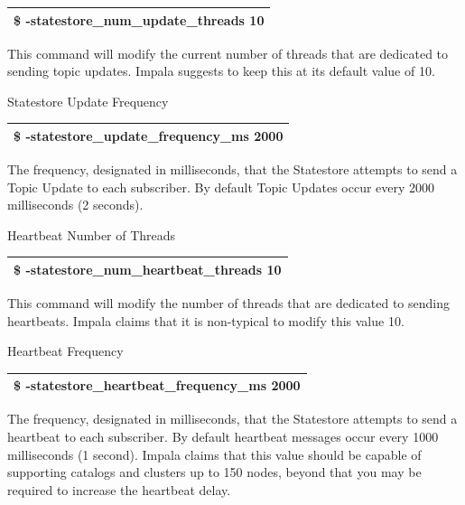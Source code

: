 \documentclass[onecolumn, draftclsnofoot,10pt, compsoc]{IEEEtran}
\begin{document}
\begin{center}
\begin{tabular}{ |c| }
    \hline
    \$ -statestore\_num\_update\_threads 10 \\
    \hline
\end{tabular}
\end{center}

This command will modify the current number of threads that are dedicated to sending topic updates.
Impala suggests to keep this at its default value of 10.

Statestore Update Frequency

\begin{center}
\begin{tabular}{ |c| }
    \hline
    \$ -statestore\_update\_frequency\_ms 2000 \\
    \hline
\end{tabular}
\end{center}

The frequency, designated in milliseconds, that the Statestore attempts to send a Topic Update to each subscriber.
By default Topic Updates occur every 2000 milliseconds (2 seconds).

Heartbeat Number of Threads
\begin{center}
\begin{tabular}{ |c| }
    \hline
    \$ -statestore\_num\_heartbeat\_threads 10 \\
    \hline
\end{tabular}
\end{center}

This command will modify the number of threads that are dedicated to sending heartbeats.
Impala claims that it is non-typical to modify this value 10.

Heartbeat Frequency

\begin{center}
\begin{tabular}{ |c| }
    \hline
    \$ -statestore\_heartbeat\_frequency\_ms 2000 \\
    \hline
\end{tabular}
\end{center}

The frequency, designated in milliseconds, that the Statestore attempts to send a heartbeat to each subscriber.
By default heartbeat messages occur every 1000 milliseconds (1 second).
Impala claims that this value should be capable of supporting catalogs and clusters up to 150 nodes, beyond that you may be required to increase the heartbeat delay.
\end{document}
